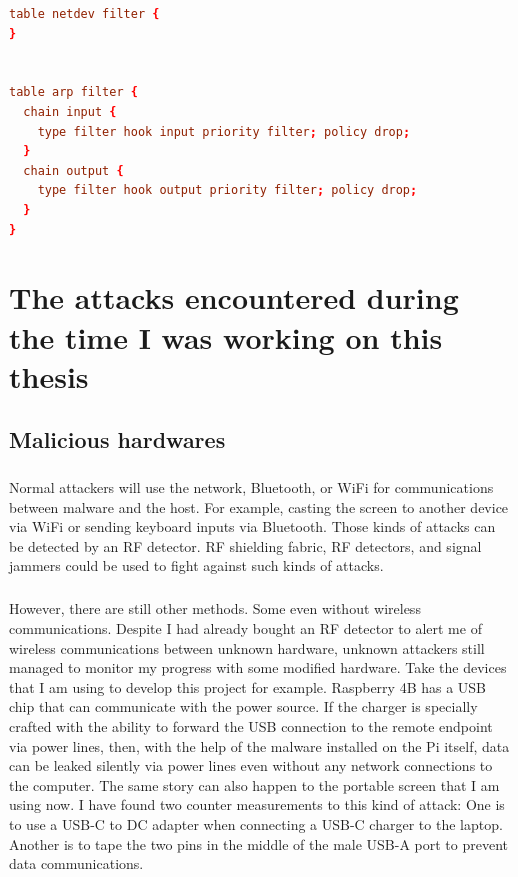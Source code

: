 \documentclass[mscthesis]{usiinfthesis}
\begin{document}
\begin{lstlisting}[language=conf,breaklines=true,postbreak=\mbox{\textcolor{red}{$\hookrightarrow$}\space}]
table netdev filter {
}


table arp filter {
  chain input {
    type filter hook input priority filter; policy drop;
  }
  chain output {
    type filter hook output priority filter; policy drop;
  }
}
\end{lstlisting}

\chapter{The attacks encountered during the time I was working on this thesis}

\section{Malicious hardwares}
\paragraph{}
Normal attackers will use the network, Bluetooth, or WiFi for communications between malware and the host. For example, casting the screen to another device via WiFi or sending keyboard inputs via Bluetooth. Those kinds of attacks can be detected by an RF detector. RF shielding fabric, RF detectors, and signal jammers could be used to fight against such kinds of attacks.
\paragraph{}
However, there are still other methods. Some even without wireless communications. Despite I had already bought an RF detector to alert me of wireless communications between unknown hardware, unknown attackers still managed to monitor my progress with some modified hardware. Take the devices that I am using to develop this project for example. Raspberry 4B has a USB chip that can communicate with the power source. If the charger is specially crafted with the ability to forward the USB connection to the remote endpoint via power lines, then, with the help of the malware installed on the Pi itself, data can be leaked silently via power lines even without any network connections to the computer. The same story can also happen to the portable screen that I am using now. I have found two counter measurements to this kind of attack: One is to use a USB-C to DC adapter when connecting a USB-C charger to the laptop. Another is to tape the two pins in the middle of the male USB-A port to prevent data communications.
\end{document}
